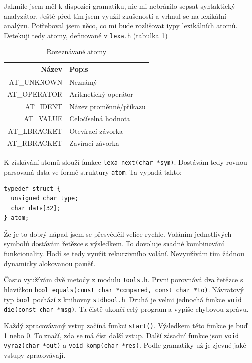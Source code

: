 \documentclass{article}
\begin{document}
Jakmile jsem měl k dispozici gramatiku, nic mi nebránilo sepsat
syntaktický analyzátor. Ještě před tím jsem využil zkušeností a vrhnul
se na lexikální analýzu.  Potřeboval jsem něco, co mi bude rozlišovat
typy lexikálních atomů. Detekuji tedy atomy, definované v
\texttt{lexa.h} (tabulka \ref{tab:atom}).

\begin{table}
\centering
\begin{tabular}{|r|l|}
\hline
Název & Popis\\ \hline\hline
AT\_UNKNOWN & Neznámý\\ \hline
AT\_OPERATOR & Aritmetický operátor\\ \hline
AT\_IDENT & Název proměnné/příkazu\\ \hline
AT\_VALUE & Celočíselná hodnota\\ \hline
AT\_LBRACKET & Otevírací závorka\\ \hline
AT\_RBRACKET & Zavírací závorka\\
\hline
\end{tabular}
\caption{Rozeznávané atomy}
\label{tab:atom}
\end{table}

K získávání atomů slouží funkce \verb+lexa_next(char *sym)+.  Dostávám
tedy rovnou parsovaná data ve formě struktury \texttt{atom}.  Ta
vypadá takto: \lstset{language=C}
\begin{lstlisting}
typedef struct {
  unsigned char type;
  char data[32];
} atom;
\end{lstlisting}

Že je to dobrý nápad jsem se přesvědčil velice rychle. Voláním
jednotlivých symbolů dostávám řetězce s výsledkem. To dovoluje
snadné kombinování funkcionality. Hodí se tedy využít rekurzivního
volání. Nevyužívám tím žádnou dynamicky alokovanou paměť.

Často využívám dvě metody z modulu \texttt{tools.h}. První porovnává
dva řetězce s hlavičkou
\verb+bool equals(const char *compared, const char *to)+. Návratový
typ \texttt{bool} pochází z knihovny \texttt{stdbool.h}. Druhá je
velmi jednochá funkce \verb+void die(const char *msg)+. Ta čistě
ukončí celý program a vypíše chybovou zprávu.

Každý zpracovávaný vstup začíná funkcí \texttt{start()}.  Výsledkem
této funkce je buď 1 nebo 0. To značí, zda se má číst další vstup.
Další zásadní funkce jsou \verb+void vyraz(char *out)+ a
\verb+void komp(char *res)+. Podle gramatiky už je zjevné jaké
vstupy zpracovávají.
\end{document}
